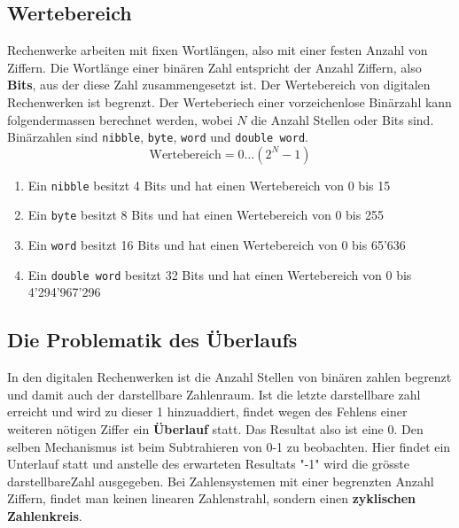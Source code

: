 \subsection{Wertebereich}
Rechenwerke arbeiten mit fixen Wortlängen, also mit einer festen Anzahl von Ziffern. Die Wortlänge einer binären Zahl entspricht der Anzahl Ziffern, also \textbf{Bits}, aus der diese Zahl zusammengesetzt ist. Der Wertebereich von digitalen Rechenwerken ist begrenzt. 
\newline\newline
Der Werteberiech einer vorzeichenlose Binärzahl kann folgendermassen berechnet werden, wobei $N$ die Anzahl Stellen oder Bits sind. Binärzahlen sind \texttt{nibble}, \texttt{byte}, \texttt{word} und \texttt{double word}. 
\begin{equation}
\boxed{\text{Wertebereich} = 0\dotso\left(2^{N}-1\right)}
\end{equation}
\begin{enumerate}[$(i)$]
\item Ein \texttt{nibble} besitzt 4 Bits und hat einen Wertebereich von 0 bis 15 
\item Ein \texttt{byte} besitzt 8 Bits und hat einen Wertebereich von 0 bis 255
\item Ein \texttt{word} besitzt 16 Bits und hat einen Wertebereich von 0 bis 65'636
\item Ein \texttt{double word} besitzt 32 Bits und hat einen Wertebereich von 0 bis 4'294'967'296
\end{enumerate}
\subsection{Die Problematik des Überlaufs}
In den digitalen Rechenwerken ist die Anzahl Stellen von binären zahlen begrenzt und damit auch der darstellbare Zahlenraum. Ist die letzte darstellbare zahl erreicht und wird zu dieser 1 hinzuaddiert, findet wegen des Fehlens einer weiteren nötigen Ziffer ein {\color{red}\textbf{Überlauf}} statt. Das Resultat also ist eine 0. Den selben Mechanismus ist beim Subtrahieren von 0-1 zu beobachten. Hier findet ein Unterlauf statt und anstelle des erwarteten Resultats "-1" wird die grösste darstellbareZahl ausgegeben. Bei Zahlensystemen mit einer begrenzten Anzahl Ziffern, findet man keinen linearen Zahlenstrahl, sondern einen {\color{red}\textbf{zyklischen Zahlenkreis}}.
